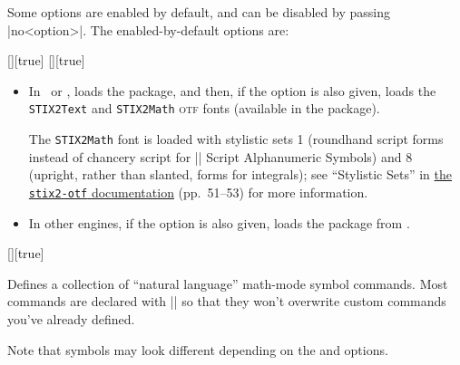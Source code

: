 \documentclass{ltxguidex}
\begin{document}
Some options are enabled by default, and can be disabled by passing
|no<option>|. The enabled-by-default options are:
\begin{keys}
	[\bool][true]
  [\bool][true]
    \begin{itemize}
      \item In \XeTeX\ or \LuaTeX, loads the  package, and
        then, if the  option is also given, loads the
        \texttt{STIX2Text} and \texttt{STIX2Math} \textsc{otf} fonts (available
        in the  package).

        The \texttt{STIX2Math} font is loaded with stylistic sets 1 (roundhand
        script forms instead of chancery script for |\mathcal| Script
        Alphanumeric Symbols) and 8 (upright, rather than slanted, forms for
        integrals); see ``Stylistic Sets'' in
        \href{http://mirrors.ctan.org/fonts/stix2-otf/STIXTwoMath-Regular.pdf}{the
        \texttt{stix2-otf} documentation} (pp.~51--53) for more information.

      \item In other engines, if the  option is also given, loads
        the  package from .
    \end{itemize}

  [\bool][true]

    Defines a collection of ``natural language'' math-mode symbol commands.
    Most commands are declared with |\ProvideDocumentCommand| so that they
    won't overwrite custom commands you've already defined.

    Note that symbols may look different depending on the  and
     options.


\end{keys}
\end{document}

